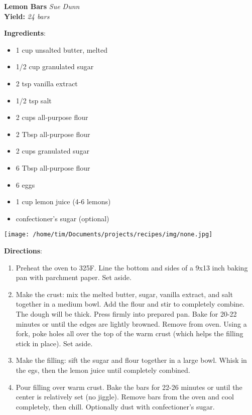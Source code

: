 \documentclass[11pt, twoside, openany]{book}
\begin{document}
\noindent\begin{minipage}[t]{\linewidth}%
{\Large\textbf{Lemon Bars}} \label{lemon-bars}\hfill\textit{Sue Dunn}\\
\textbf{Yield:} \textit{24 bars}\\
\noindent\begin{minipage}[t]{0.78\linewidth}%
\textbf{Ingredients}:\vspace{-3mm}
\begin{multicols}{2}
\begin{itemize}\setlength\itemsep{-1mm}
\item 1 cup unsalted butter, melted
\item 1/2 cup granulated sugar
\item 2 tsp vanilla extract
\item 1/2 tsp salt
\item 2 cups all-purpose flour
\item 2 Tbsp all-purpose flour
\item 2 cups granulated sugar
\item 6 Tbsp all-purpose flour
\item 6 eggs
\item 1 cup lemon juice (4-6 lemons)
\item confectioner's sugar (optional)
\end{itemize}
\end{multicols}
\end{minipage}
\noindent\begin{minipage}[t]{0.18\linewidth}
\centering \strut\vspace*{-\baselineskip}\newline
\texttt{[image: /home/tim/Documents/projects/recipes/img/none.jpg]}\\
\end{minipage}\vspace{3mm}
\textbf{Directions}:
\vspace{-3mm}\begin{enumerate}\setlength\itemsep{-1mm}
\item Preheat the oven to 325F. Line the bottom and sides of a 9x13 inch baking pan with parchment paper. Set aside.
\item Make the crust: mix the melted butter, sugar, vanilla extract, and salt together in a medium bowl. Add the flour and stir to completely combine. The dough will be thick. Press firmly into prepared pan. Bake for 20-22 minutes or until the edges are lightly browned. Remove from oven. Using a fork, poke holes all over the top of the warm crust (which helps the filling stick in place). Set aside.
\item Make the filling: sift the sugar and flour together in a large bowl. Whisk in the egs, then the lemon juice until completely combined.
\item Pour filling over warm crust. Bake the bars for 22-26 minutes or until the center is relatively set (no jiggle). Remove bars from the oven and cool completely, then chill. Optionally dust with confectioner's sugar.
\end{enumerate}
\end{minipage}\vspace{8mm}
\end{document}
